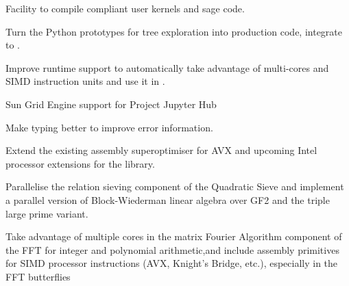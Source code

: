 \begin{workpackage}
\begin{wpdelivs}
  \begin{wpdeliv}[due=3,id=pythran-sage,dissem=PU,nature=DEM,lead=UJF]
      {Facility to compile \Pythran compliant user kernels and sage code.}
  \end{wpdeliv}
  \begin{wpdeliv}[due=3,id=sage-paral-tree,dissem=PU,nature=DEM,lead=PS]
      {Turn the Python prototypes for tree exploration into production code, integrate to \Sage.}
\end{wpdeliv}
  \begin{wpdeliv}[due=9,id=pythran-cython,dissem=PU,nature=DEM,lead=LL]
      {Improve \Pythran runtime support to automatically take advantage of multi-cores and SIMD instruction units and use it in \Cython.}
  \end{wpdeliv}
  \begin{wpdeliv}[due=12,id=SGE-jupyter,dissem=PU,nature=OTHER,lead=USH]
      {Sun Grid Engine support for Project Jupyter Hub}
  \end{wpdeliv}
  \begin{wpdeliv}[due=12,id=pythran-typing,dissem=PU,nature=DEM, lead=UJF]
      {Make \Pythran typing better to improve error information.}
  \end{wpdeliv}
  \begin{wpdeliv}[due=18,id=MPIRsuperoptimiser,dissem=PU,nature=DEM,lead=UK]
      {Extend the existing assembly superoptimiser for AVX and upcoming Intel
        processor extensions for the \MPIR library.}
\end{wpdeliv}
  \begin{wpdeliv}[due=18,id=QS-linalg,dissem=PU,nature=DEM,lead=UK]
      {Parallelise the relation sieving component of the Quadratic Sieve and implement a parallel version of Block-Wiederman linear algebra over GF2 and the triple large prime variant.}
  \end{wpdeliv}
  \begin{wpdeliv}[due=18,id=FFT,dissem=PU,nature=DEM, lead=UK]
    {Take advantage of multiple cores in the matrix Fourier Algorithm component of the FFT
      for integer and polynomial arithmetic,and include assembly primitives for SIMD
      processor instructions (AVX, Knight's Bridge, etc.), especially in the FFT
      butterflies}

\end{wpdeliv}
\end{wpdelivs}
\end{workpackage}
